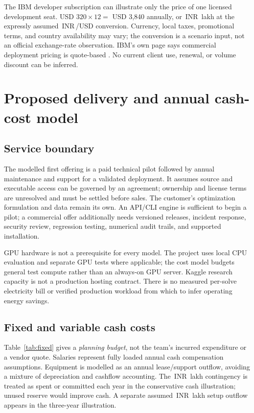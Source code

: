 \documentclass[11pt,a4paper]{article}
\newcommand{\inr}{\ifmmode\text{INR}\,\else INR\,\fi}
\newcommand{\lac}{\ifmmode\,\text{lakh}\else\,lakh\fi}
\begin{document}
The IBM developer subscription can illustrate only the price of one licensed development seat. USD \(320\times12=\) USD 3,840 annually, or \inr3.456\lac{} at the expressly assumed \inr90/USD conversion. Currency, local taxes, promotional terms, and country availability may vary; the conversion is a scenario input, not an official exchange-rate observation. IBM's own page says commercial deployment pricing is quote-based \cite{ibmprice}. No current client use, renewal, or volume discount can be inferred.

\section{Proposed delivery and annual cash-cost model}

\subsection{Service boundary}

The modelled first offering is a paid technical pilot followed by annual maintenance and support for a validated deployment. It assumes source and executable access can be governed by an agreement; ownership and license terms are unresolved and must be settled before sales. The customer's optimization formulation and data remain its own. An API/CLI engine is sufficient to begin a pilot; a commercial offer additionally needs versioned releases, incident response, security review, regression testing, numerical audit trails, and supported installation.

GPU hardware is not a prerequisite for every model. The project uses local CPU evaluation and separate GPU tests where applicable; the cost model budgets general test compute rather than an always-on GPU server. Kaggle research capacity is not a production hosting contract. There is no measured per-solve electricity bill or verified production workload from which to infer operating energy savings.

\subsection{Fixed and variable cash costs}

Table~\ref{tab:fixed} gives a \emph{planning budget}, not the team's incurred expenditure or a vendor quote. Salaries represent fully loaded annual cash compensation assumptions. Equipment is modelled as an annual lease/support outflow, avoiding a mixture of depreciation and cashflow accounting. The \inr3\lac{} contingency is treated as spent or committed each year in the conservative cash illustration; unused reserve would improve cash. A separate assumed \inr5\lac{} setup outflow appears in the three-year illustration.
\end{document}
